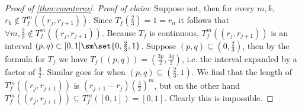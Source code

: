 \documentclass[11pt, final]{amsart}
\newcommand{\nin}{\notin}
\newcommand{\half}{\frac 12}
\begin{document}
\begin{proof}[Proof of \autoref{thm:counterex}]
\emph{Proof of claim}:
%
%
Suppose not, then for every $m, k$, $r_k \nin T_f^m((r_j, r_{j+1}))$. Since $T_f(\frac 23) = 1 = r_n$ it follows that $\forall m, \frac 23 \nin T_f^m((r_j, r_{j+1}))$. %
Because $T_f$ is continuous, $T_f^m((r_j, r_{j+1}))$ is an interval $(p, q) \subset [0, 1] \sm \set {0, \frac 23, 1}$. Suppose $(p, q) \subseteq (0, \frac 23)$, then by the formula for $T_f$ we have $T_f((p, q)) = (\frac{3p}2, \frac{3q}2)$, i.e. the interval expanded by a factor of $\frac 32$. Similar goes for when $(p, q) \subseteq (\frac 23, 1)$. 
We find that the length of $T_f^m((r_j, r_{j+1}))$ is $(r_{j+1} - r_j)\left(\frac 32\right)^m$, but on the other hand $T_f^m((r_j, r_{j+1})) \subseteq T_f^m([0, 1]) = [0, 1]$. Clearly this is impossible.%
%
\end{proof}
\end{document}
